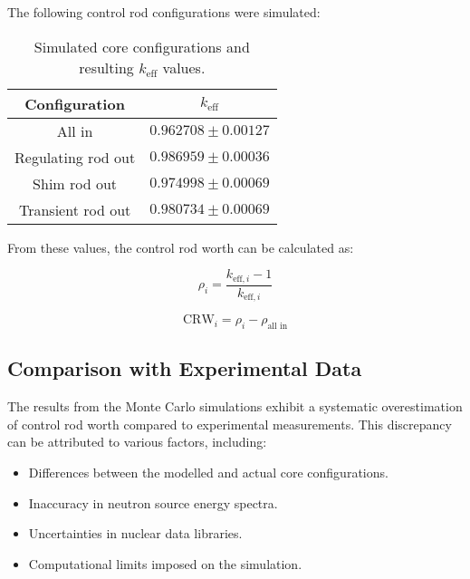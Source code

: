 The following control rod configurations were simulated:

\begin{table}[H]
    \centering
    \begin{tabular}{|c|c|}
        \hline
        \textbf{Configuration} & \textbf{\( k_{\text{eff}} \)} \\
        \hline
        All in & $0.962708 \pm 0.00127$ \\
        Regulating rod out & $0.986959 \pm 0.00036$ \\
        Shim rod out & $0.974998 \pm 0.00069$ \\
        Transient rod out & $0.980734 \pm 0.00069$ \\
        \hline
    \end{tabular}
    \caption{Simulated core configurations and resulting $ k_{\text{eff}} $ values.}
    \label{tab:keff_values}
\end{table}

From these values, the control rod worth can be calculated as:

\begin{equation}
\rho _i = \frac{k_{\text{eff}, i} - 1}{k_{\text{eff}, i}}
\end{equation}

\begin{equation}
\text{CRW}_i = \rho_{i} - \rho_{\text{all in}} 
\end{equation}

\subsection{Comparison with Experimental Data}

The results from the Monte Carlo simulations exhibit a systematic overestimation of control rod worth compared to experimental measurements. This discrepancy can be attributed to various factors, including:

\begin{itemize}
    \item Differences between the modelled and actual core configurations.
    \item Inaccuracy in neutron source energy spectra.
    \item Uncertainties in nuclear data libraries.
    \item Computational limits imposed on the simulation.
\end{itemize}

